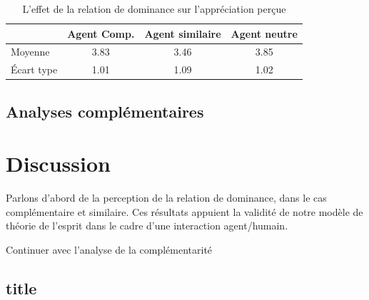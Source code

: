 	
			\begin{table}[!tb]
				\caption{L'effet de la relation de dominance sur l'appréciation perçue} 
				\centering
				
				\begin{tabular}{ l c c c }
					\hline
					\textbf{ }& \textbf{Agent Comp.} & \textbf{Agent similaire} & \textbf{Agent neutre} \\ 
					\hline
					\newline Moyenne & 3.83 & 3.46 & 3.85 \\
					\newline Écart type & 1.01 & 1.09& 1.02 \\
					\hline
					
				\end{tabular}
				
				\label{tab:app}
			\end{table}
			
\subsection{Analyses complémentaires}

\section{Discussion}
\label{sec:discussion}
Parlons d'abord de la perception de la relation de dominance, dans le cas complémentaire et similaire. Ces résultats appuient la validité de notre modèle de théorie de l'esprit dans le cadre d'une interaction agent/humain.   

Continuer avec l'analyse de la complémentarité 

\subsection{title}